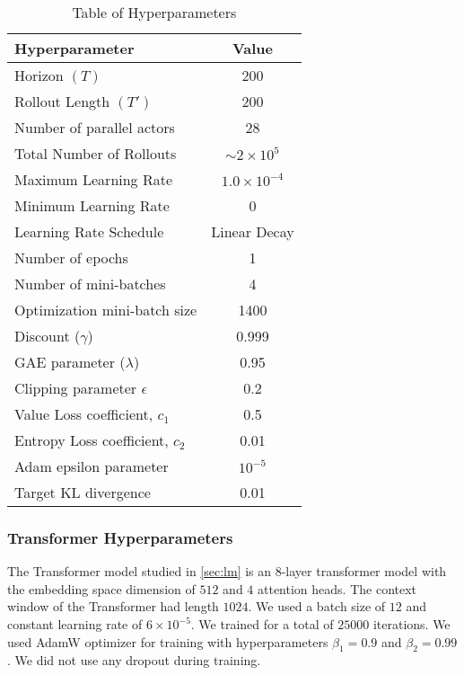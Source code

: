 \begin{table}[ht]
	\centering
	\begin{tabular}{lc}
		\hline
		Hyperparameter & Value \\
		\hline
		Horizon $(T)$ & 200 \\
		Rollout Length $(T')$ & 200 \\
		Number of parallel actors & 28 \\
		Total Number of Rollouts & $\sim 2 \times 10^5$ \\
		Maximum Learning Rate & $1.0 \times 10^{-4}$ \\
		Minimum Learning Rate & 0 \\
		Learning Rate Schedule & Linear Decay \\
		Number of epochs & 1 \\
		Number of mini-batches & 4 \\
		Optimization mini-batch size & 1400 \\
		Discount ($\gamma$) & 0.999 \\
		GAE parameter ($\lambda$) & 0.95 \\
		Clipping parameter $\epsilon$ & 0.2 \\
		Value Loss coefficient, $c_1$ & 0.5 \\
		Entropy Loss coefficient, $c_2$ & 0.01 \\
		Adam epsilon parameter & $10^{-5}$ \\
		Target KL divergence & 0.01 \\
		\hline
	\end{tabular}
	\caption{Table of Hyperparameters}
	\label{tab:ppo_hyperparameters}
\end{table}

\subsubsection*{Transformer Hyperparameters}
The Transformer model studied in \cref{sec:lm} is an 8-layer transformer model with the embedding space dimension of $512$ and $4$ attention heads. The context window of the Transformer had length $1024$. We used a batch size of $12$ and constant learning rate of $6 \times 10^{-5}$. We trained for a total of $25000$ iterations. We used AdamW optimizer for training with hyperparameters $\beta_1 = 0.9$ and $\beta_2 = 0.99$. We did not use any dropout during training.